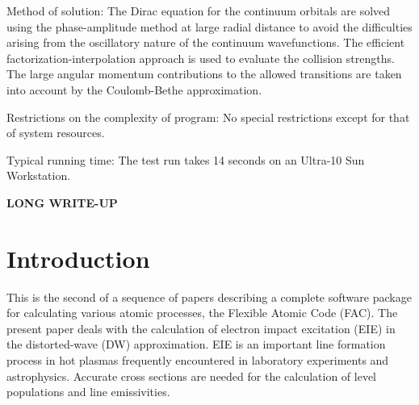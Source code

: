 \documentclass{elsart}
\begin{document}
Method of solution: The Dirac equation for the continuum orbitals are solved
using the phase-amplitude method at large radial distance to avoid the
difficulties arising from the oscillatory nature of the continuum
wavefunctions. The efficient factorization-interpolation approach is used to
evaluate the collision strengths. The large angular momentum contributions to
the allowed transitions are taken into account by the Coulomb-Bethe
approximation.  

Restrictions on the complexity of program: No special restrictions except for
that of system resources. 

Typical running time: The test run takes 14 seconds on an Ultra-10 Sun
Workstation. 

\textbf{\large LONG WRITE-UP}

\section{Introduction}
This is the second of a sequence of papers describing a complete software
package for calculating various atomic processes, the Flexible Atomic Code
(FAC). The present paper deals with the calculation of electron impact
excitation (EIE) in the distorted-wave (DW) approximation. EIE is an important
line formation process in hot plasmas frequently encountered in laboratory
experiments and astrophysics. Accurate cross sections are needed for the
calculation of level populations and line emissivities. 
\end{document}
